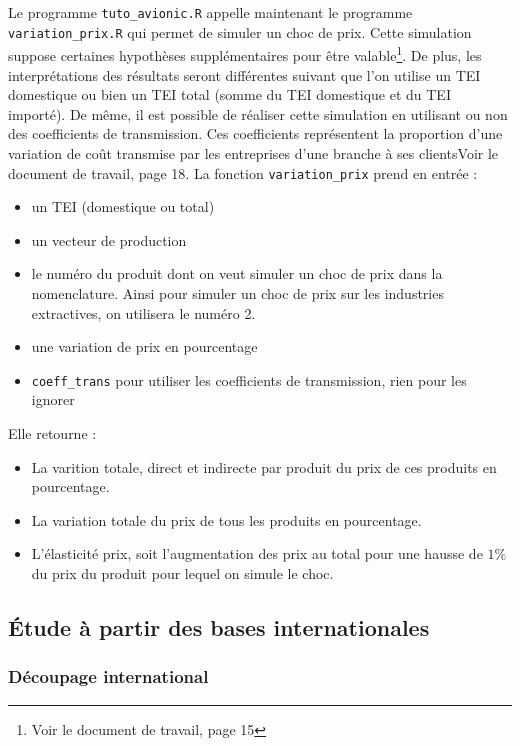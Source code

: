\documentclass[a4paper,french,11pt]{article}
\begin{document}
Le programme \verb|tuto_avionic.R| appelle maintenant le programme \verb|variation_prix.R| qui permet de simuler un choc de prix. Cette simulation suppose certaines hypoth\`eses suppl\'ementaires pour \^etre valable\footnote{Voir le document de travail, page 15}. De plus, les interpr\'etations des r\'esultats seront diff\'erentes suivant que l'on utilise un TEI domestique ou bien un TEI total (somme du TEI domestique et du TEI import\'e). De m\^eme, il est possible de r\'ealiser cette simulation en utilisant ou non des coefficients de transmission. Ces coefficients repr\'esentent la proportion d’une variation de co\^ut transmise par les entreprises d’une branche à ses clients{Voir le document de travail, page 18}.
La fonction \verb|variation_prix| prend en entr\'ee : 
\begin{itemize}
\item un TEI (domestique ou total)
\item un vecteur de production
\item le num\'ero  du produit dont on veut simuler un choc de prix dans la nomenclature. Ainsi pour simuler un choc de prix sur les industries extractives, on utilisera le num\'ero 2.
\item une variation de prix en pourcentage
\item \verb|coeff_trans| pour utiliser les coefficients de transmission, rien pour les ignorer

\end{itemize} 

Elle retourne :

\begin{itemize}
\item La varition totale, direct et indirecte par produit du prix de ces produits en pourcentage.
\item La variation totale du prix de tous les produits en pourcentage.
\item L'\'elasticit\'e prix, soit l'augmentation des prix au total pour une hausse de $1\%$ du prix du produit pour lequel on simule le choc.

\end{itemize} 


\subsection{\'Etude \`a partir des bases internationales}

\subsubsection{D\'ecoupage international}
\end{document}
